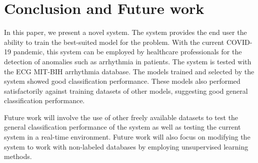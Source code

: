 \section{Conclusion and Future work} \label{sec:conclusion_and_future_work}
In this paper, we present a novel system. The system provides the end user the ability to train the best-suited model for the problem. With the current COVID-19 pandemic, this system can be employed by healthcare professionals for the detection of anomalies such as arrhythmia in patients. The system is tested with the ECG MIT-BIH arrhythmia database. {\responsemod The models trained and selected by the system showed good classification performance. These models also performed satisfactorily against training datasets of other models, suggesting good general classification performance.}

Future work will involve the use of other freely available datasets to test the general classification performance of the system as well as testing the current system in a real-time environment. {\responsemod Future work will also focus on modifying the system to work with non-labeled databases by employing unsupervised learning methods.}
